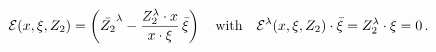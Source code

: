 \begin{equation}
{\cal E}(x,\xi,Z_2)=
\left(\bar{Z_{2}}^{\lambda}-\frac{Z_{2}^{\lambda}\cdot x}{x\cdot
\xi}\,\bar{\xi}\right)\quad\mbox{with}\quad{\cal
E}^{\lambda}(x,\xi,Z_2)\cdot \bar\xi=Z_{2}^{\lambda}\cdot\xi =0
\,. \label{eq:vect}
\end{equation}

